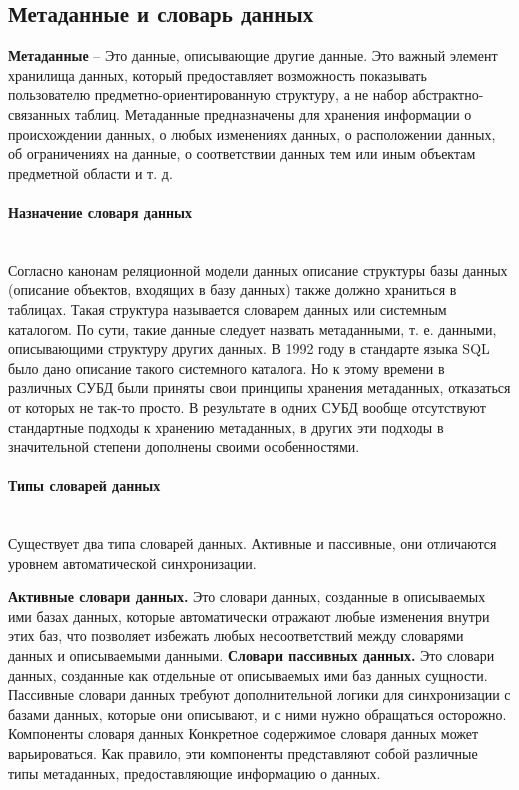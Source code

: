\subsection{Метаданные и словарь данных}

\begin{grayquote}
	\textbf{Метаданные} -- Это данные, описывающие другие данные. Это важный
элемент хранилища данных, который предоставляет возможность показывать пользователю предметно-ориентированную структуру, а не набор абстрактно-связанных таблиц. Метаданные предназначены для хранения
информации о происхождении данных, о любых изменениях данных, о
расположении данных, об ограничениях на данные, о соответствии данных тем или иным объектам предметной области и т. д. \autocite{Pirogov2009}
\end{grayquote}

\paragraph{Назначение словаря данных} ~\\

Согласно канонам реляционной модели данных описание структуры базы
данных (описание объектов, входящих в базу данных) также должно храниться в таблицах. Такая структура называется словарем данных или системным каталогом. По сути, такие данные следует назвать метаданными, т. е. данными, описывающими структуру других
данных.
В 1992 году в стандарте языка SQL было дано описание такого системного
каталога. Но к этому времени в различных СУБД были приняты свои принципы хранения метаданных, отказаться от которых не так-то просто. В результате в одних СУБД вообще отсутствуют стандартные подходы к хранению метаданных, в других эти подходы в значительной степени дополнены своими особенностями. \autocite{Pirogov2009}

\paragraph{Типы словарей данных} ~\\

Существует два типа словарей данных. Активные и пассивные, они отличаются уровнем автоматической синхронизации.

\textbf{Активные словари данных.} Это словари данных, созданные в описываемых ими базах данных, которые автоматически отражают любые изменения внутри этих баз, что позволяет избежать любых несоответствий между словарями данных и описываемыми данными.
\textbf{Словари пассивных данных.} Это словари данных, созданные как отдельные от описываемых ими баз данных сущности. Пассивные словари данных требуют дополнительной логики для синхронизации с базами данных, которые они описывают, и с ними нужно обращаться осторожно.
Компоненты словаря данных
Конкретное содержимое словаря данных может варьироваться. Как правило, эти компоненты представляют собой различные типы метаданных, предоставляющие информацию о данных. \autocite{DataDictionary}

